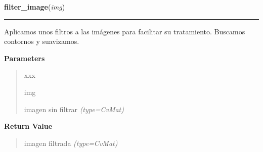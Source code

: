 \hspace{.8\funcindent}\begin{boxedminipage}{\funcwidth}

    \raggedright \textbf{filter\_image}(\textit{img})

    \vspace{-1.5ex}

    \rule{\textwidth}{0.5\fboxrule}
\setlength{\parskip}{2ex}
Aplicamos unos filtros a las imágenes para facilitar su tratamiento. Buscamos contornos y suavizamos.

\setlength{\parskip}{1ex}
      \textbf{Parameters}
      \vspace{-1ex}

      \begin{quote}
        \begin{Ventry}{xxx}

          \item[img]


imagen sin filtrar
            {\it (type=CvMat)}

        \end{Ventry}

      \end{quote}

      \textbf{Return Value}
    \vspace{-1ex}

      \begin{quote}

imagen filtrada
      {\it (type=CvMat)}

      \end{quote}

    \end{boxedminipage}

    \label{src:search_goban:detect_contour}

    \vspace{0.5ex}

